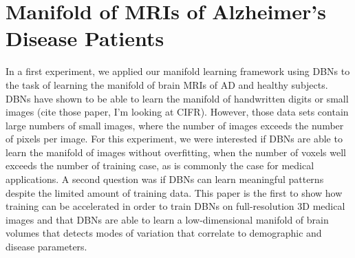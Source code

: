 



\section{Manifold of MRIs of Alzheimer's Disease Patients}


In a first experiment, we applied our manifold learning framework using DBNs to
the task of learning the manifold of brain MRIs of AD and healthy subjects. DBNs
have shown to be able to learn the manifold of handwritten digits or small
images (cite those paper, I'm looking at CIFR). However, those data sets contain
large numbers of small images, where the number of images exceeds the number of
pixels per image. For this experiment, we were interested if DBNs are able to
learn the manifold of images without overfitting, when the number of voxels well
exceeds the number of training case, as is commonly the case for medical
applications. A second question was if DBNs can learn meaningful patterns
despite the limited amount of training data. This paper is the first to show how
training can be accelerated in order to train DBNs on full-resolution 3D medical
images and that DBNs are able to learn a low-dimensional manifold of brain
volumes that detects modes of variation that correlate to demographic and
disease parameters.

